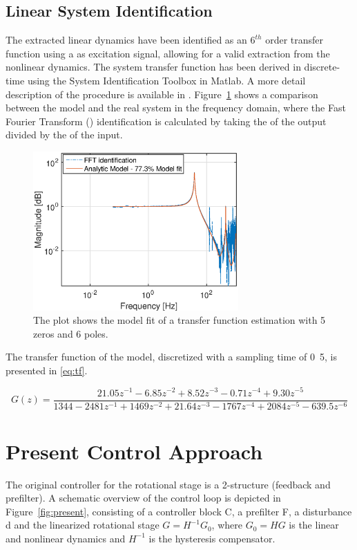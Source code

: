 \subsection{Linear System Identification}
\label{sec:linsys}
The extracted linear dynamics have been identified as an $6^{th}$ order transfer function using a \abbrPRBS as excitation signal, allowing for a valid extraction from the nonlinear dynamics. The system transfer function has been derived in discrete-time using the System Identification Toolbox in Matlab. A more detail description of the procedure is available in \citep{ButcherController:2015}. Figure~\ref{fig:model} shows a comparison between the model and the real system in the frequency domain, where the Fast Fourier Transform (\abbrFFT) identification is calculated by taking the \abbrFFT of the output divided by the \abbrFFT of the input.
\begin{figure}[h]
  \centering
  \includegraphics[width=0.7\textwidth]{fig/matlab/model.eps}
  \caption{\label{fig:model} The plot shows the model fit of a transfer function estimation with 5 zeros and 6 poles.}
\end{figure}
The transfer function of the model, discretized with a sampling time of \unit{0.5}{\milli\second}, is presented in \eqref{eq:tf}.

\begin{equation}
  \label{eq:tf}
  G(z) = \frac{21.05z^{-1} - 6.85z^{-2} + 8.52z^{-3} - 0.71z^{-4} + 9.30z^{-5}}{1344 - 2481z^{-1} + 1469z^{-2} + 21.64z^{-3} - 1767z^{-4} + 2084z^{-5} - 639.5z^{-6}}
\end{equation}

\FloatBarrier
\section{Present Control Approach}\label{sec:presentControlApproach}
The original controller for the rotational stage is a 2-\abbrDOF structure (feedback and prefilter). A schematic overview of the control loop is depicted in Figure~\ref{fig:present}, consisting of a controller block C, a prefilter F, a disturbance d and the linearized rotational stage $G = H^{-1}G_0$, where $G_0 = HG$ is the linear and nonlinear dynamics and $H^{-1}$ is the hysteresis compensator.

